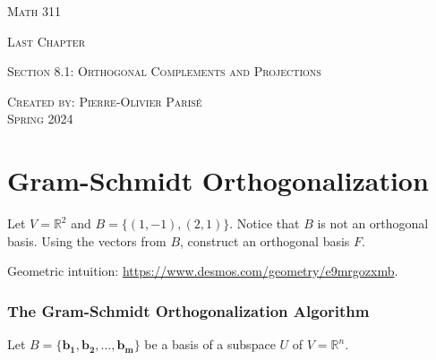 \documentclass[20pt,a4paper]{extarticle}
\newcounter{example}
\begin{document}
\thispagestyle{empty}

\begin{center}
\vspace*{0.75cm}

{\Huge \textsc{Math 311}}

\vspace*{1.5cm}

{\LARGE \textsc{Last Chapter}} 

\vspace*{0.75cm}

\noindent\textsc{Section 8.1: Orthogonal Complements and Projections}

\vspace*{0.25cm}


\begin{footnotesize}

\tableofcontents
\end{footnotesize}

\vfill

\noindent \textsc{Created by: Pierre-Olivier Paris{\'e}} \\
\textsc{Spring 2024}
\end{center}

\newpage

\section{Gram-Schmidt Orthogonalization}

\begin{example}
Let $V = \mathbb{R}^2$ and $B = \{ (1, -1) , (2, 1) \}$. Notice that $B$ is not an orthogonal basis. Using the vectors from $B$, construct an orthogonal basis $F$. 
\end{example}

\begin{solution}
Geometric intuition: \url{https://www.desmos.com/geometry/e9mrgozxmb}.

\end{solution}

\newpage 

\subsubsection{The Gram-Schmidt Orthogonalization Algorithm}

Let $B = \{ \mathbf{b_1} , \mathbf{b_2} , \ldots , \mathbf{b_m} \}$ be a basis of a subspace $U$ of $V = \mathbb{R}^n$. 
\end{document}
